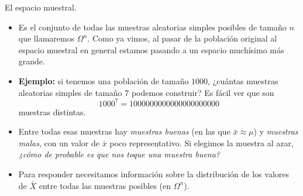 \documentclass[
  9pt,
  ignorenonframetext,
]{beamer}
\begin{document}
\begin{frame}{El espacio muestral.}
\protect\hypertarget{el-espacio-muestral.}{}

\begin{itemize}
\item
  Es el conjunto de todas las muestras aleatorias simples posibles de
  tamaño \(n\) que llamaremos \(\Omega^n\). Como ya vimos, al pasar de
  la población original al espacio muestral en general estamos pasando a
  un espacio muchísimo más grande.
\item
  \textbf{Ejemplo:} si tenemos una población de tamaño \(1000\),
  ¿cuántas muestras aleatorias simples de tamaño 7 podemos construir? Es
  fácil ver que son \[1000^7 = 1000000000000000000000\] muestras
  distintas.
\item
  Entre todas esas muestras hay \emph{muestras buenas} (en las que
  \(\bar x\approx\mu\)) y \emph{muestras malas}, con un valor de
  \(\bar x\) poco representativo. Si elegimos la muestra al azar,
  \emph{¿cómo de probable es que nos toque una muestra buena?}
\item
  Para responder necesitamos información sobre la distribución de los
  valores de \(\bar X\) entre todas las muestras posibles (en
  \(\Omega^n\)).
\end{itemize}

\end{frame}
\end{document}
